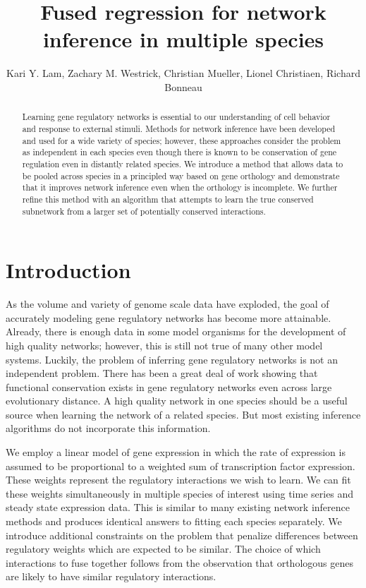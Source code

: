 \documentclass[11pt]{article}
\begin{document}
\title{Fused regression for network inference in multiple species}
\author{Kari Y. Lam, Zachary M. Westrick, Christian Mueller, Lionel Christiaen, Richard Bonneau}
\maketitle

\begin{abstract}
Learning gene regulatory networks is essential to our understanding of cell behavior and response to external stimuli. Methods for network inference have been developed and used for a wide variety of species; however, these approaches consider the problem as independent in each species even though there is known to be conservation of gene regulation even in distantly related species. We introduce a method that allows data to be pooled across species in a principled way based on gene orthology and demonstrate that it improves network inference even when the orthology is incomplete. We further refine this method with an algorithm that attempts to learn the true conserved subnetwork from a larger set of potentially conserved interactions. 
\end{abstract}

\section{Introduction}
As the volume and variety of genome scale data have exploded, the goal of accurately modeling gene regulatory networks has become more attainable. Already, there is enough data in some model organisms for the development of high quality networks; however, this is still not true of many other model systems. Luckily, the problem of inferring gene regulatory networks is not an independent problem. There has been a great deal of work showing that functional conservation exists in gene regulatory networks even across large evolutionary distance. A high quality network in one species should be a useful source when learning the network of a related species. But most existing inference algorithms do not incorporate this information.

We employ a linear model of gene expression in which the rate of expression is assumed to be proportional to a weighted sum of transcription factor expression. These weights represent the regulatory interactions we wish to learn. We can fit these weights simultaneously in multiple species of interest using time series and steady state expression data. This is similar to many existing network inference methods and produces identical answers to fitting each species separately. We introduce additional constraints on the problem that penalize differences between regulatory weights which are expected to be similar. The choice of which interactions to fuse together follows from the observation that orthologous genes are likely to have similar regulatory interactions.  
\end{document}
